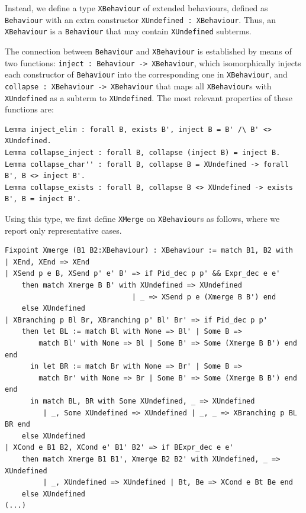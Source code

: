 \documentclass[runningheads]{llncs}
\begin{document}
Instead, we define a type \lstinline+XBehaviour+ of extended behaviours, defined as \lstinline+Behaviour+ with an extra constructor \lstinline+XUndefined : XBehaviour+.
Thus, an \lstinline+XBehaviour+ is a \lstinline+Behaviour+ that may contain \lstinline+XUndefined+
subterms.

The connection between \lstinline+Behaviour+ and \lstinline+XBehaviour+ is established by means of
two functions: \lstinline+inject : Behaviour -> XBehaviour+, which isomorphically injects each
constructor of \lstinline+Behaviour+ into the corresponding one in \lstinline+XBehaviour+, and
\lstinline+collapse : XBehaviour -> XBehaviour+ that maps all \lstinline+XBehaviour+s with
\lstinline+XUndefined+ as a subterm to \lstinline+XUndefined+.
The most relevant properties of these functions are:
\begin{lstlisting}
Lemma inject_elim : forall B, exists B', inject B = B' /\ B' <> XUndefined.
Lemma collapse_inject : forall B, collapse (inject B) = inject B.
Lemma collapse_char'' : forall B, collapse B = XUndefined -> forall B', B <> inject B'.
Lemma collapse_exists : forall B, collapse B <> XUndefined -> exists B', B = inject B'.
\end{lstlisting}

Using this type, we first define \lstinline+XMerge+ on \lstinline+XBehaviour+s as follows, where
we report only representative cases.
\begin{lstlisting}
Fixpoint Xmerge (B1 B2:XBehaviour) : XBehaviour := match B1, B2 with
| XEnd, XEnd => XEnd
| XSend p e B, XSend p' e' B' => if Pid_dec p p' && Expr_dec e e'
    then match Xmerge B B' with XUndefined => XUndefined
                              | _ => XSend p e (Xmerge B B') end
    else XUndefined
| XBranching p Bl Br, XBranching p' Bl' Br' => if Pid_dec p p'
    then let BL := match Bl with None => Bl' | Some B =>
        match Bl' with None => Bl | Some B' => Some (Xmerge B B') end end
      in let BR := match Br with None => Br' | Some B =>
        match Br' with None => Br | Some B' => Some (Xmerge B B') end end
      in match BL, BR with Some XUndefined, _ => XUndefined
         | _, Some XUndefined => XUndefined | _, _ => XBranching p BL BR end
    else XUndefined
| XCond e B1 B2, XCond e' B1' B2' => if BExpr_dec e e'
    then match Xmerge B1 B1', Xmerge B2 B2' with XUndefined, _ => XUndefined
         | _, XUndefined => XUndefined | Bt, Be => XCond e Bt Be end
    else XUndefined                                                        (...)
\end{lstlisting}
\end{document}
